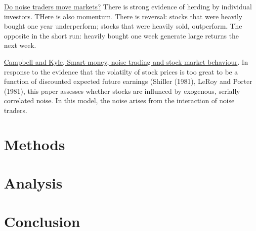 \documentclass[12pt, a4paper, oneside]{article}\usepackage[]{graphicx}\usepackage[]{color}
\begin{document}
\href{http://papers.ssrn.com.ezproxy.liv.ac.uk/sol3/papers.cfm?abstract_id=869827}{Do noise traders move markets?}  There is strong evidence of herding by individual investors. THere is also momentum. There is reversal:  stocks that were heavily bought one year underperform; stocks that were heavily sold, outperform. The opposite in the short run:  heavily bought one week generate large returns the next week. 

\href{http://restud.oxfordjournals.org.ezproxy.liv.ac.uk/content/60/1/1.full.pdf+html}{Campbell and Kyle, Smart money, noise trading and stock market behaviour}. In response to the evidence that the volatilty of stock prices is too great to be a function of discounted expected future earnings (Shiller (1981),  LeRoy and Porter (1981), this paper assesses whether stocks are influnced by exogenous, serially correlated noise. In this model, the noise arises from the interaction of noise traders.  





\section{Methods}
\section{Analysis}
\section{Conclusion}
\end{document}
